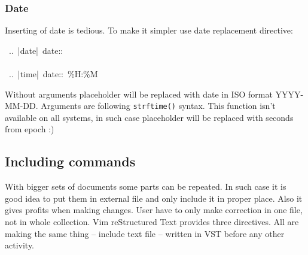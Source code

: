 \documentclass[12pt]{article}
\begin{document}
\subsubsection{Date}

Inserting of date is tedious. To make it simpler use date replacement
directive:

\begin{ttfamily}\begin{flushleft}
\mbox{~..~|date|~date::}\\
\mbox{}\\
\mbox{~..~|time|~date::~\%H:\%M}\\
\end{flushleft}\end{ttfamily}

Without arguments placeholder will be replaced with date in ISO format
YYYY-MM-DD. Arguments are following \texttt{strftime()} syntax. This function isn't
available on all systems, in such case placeholder will be replaced with
seconds from epoch :)

\hypertarget{lincluding-commands}{}
\subsection{Including commands}

With bigger sets of documents some parts can be repeated. In such case it is
good idea to put them in external file and only include it in proper place.
Also it gives profits when making changes. User have to only make correction
in one file, not in whole collection. Vim reStructured Text provides three directives. All are
making the same thing -- include text file -- written in VST before any other
activity.
\end{document}
